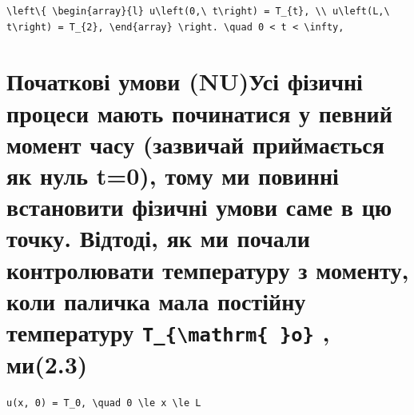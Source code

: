 \documentclass[
  ukrainian,
]{article}
\begin{document}
\begin{verbatim}
\left\{ \begin{array}{l} u\left(0,\ t\right) = T_{t}, \\ u\left(L,\ t\right) = T_{2}, \end{array} \right. \quad 0 < t < \infty,
\end{verbatim}

\section{\texorpdfstring{Початкові умови (NU)Усі фізичні процеси мають
починатися у певний момент часу (зазвичай приймається як нуль t=0), тому
ми повинні встановити фізичні умови саме в цю точку. Відтоді, як ми
почали контролювати температуру з моменту, коли паличка мала постійну
температуру \texttt{T\_\{\textbackslash{}mathrm\{\ \}o\}} ,
ми(2.3)}{Початкові умови (NU)Усі фізичні процеси мають починатися у певний момент часу (зазвичай приймається як нуль t=0), тому ми повинні встановити фізичні умови саме в цю точку. Відтоді, як ми почали контролювати температуру з моменту, коли паличка мала постійну температуру T\_\{\textbackslash mathrm\{ \}o\} , ми(2.3)}}\label{ux43fux43eux447ux430ux442ux43aux43eux432ux456-ux443ux43cux43eux432ux438-nuux443ux441ux456-ux444ux456ux437ux438ux447ux43dux456-ux43fux440ux43eux446ux435ux441ux438-ux43cux430ux44eux442ux44c-ux43fux43eux447ux438ux43dux430ux442ux438ux441ux44f-ux443-ux43fux435ux432ux43dux438ux439-ux43cux43eux43cux435ux43dux442-ux447ux430ux441ux443-ux437ux430ux437ux432ux438ux447ux430ux439-ux43fux440ux438ux439ux43cux430ux454ux442ux44cux441ux44f-ux44fux43a-ux43dux443ux43bux44c-t0-ux442ux43eux43cux443-ux43cux438-ux43fux43eux432ux438ux43dux43dux456-ux432ux441ux442ux430ux43dux43eux432ux438ux442ux438-ux444ux456ux437ux438ux447ux43dux456-ux443ux43cux43eux432ux438-ux441ux430ux43cux435-ux432-ux446ux44e-ux442ux43eux447ux43aux443.-ux432ux456ux434ux442ux43eux434ux456-ux44fux43a-ux43cux438-ux43fux43eux447ux430ux43bux438-ux43aux43eux43dux442ux440ux43eux43bux44eux432ux430ux442ux438-ux442ux435ux43cux43fux435ux440ux430ux442ux443ux440ux443-ux437-ux43cux43eux43cux435ux43dux442ux443-ux43aux43eux43bux438-ux43fux430ux43bux438ux447ux43aux430-ux43cux430ux43bux430-ux43fux43eux441ux442ux456ux439ux43dux443-ux442ux435ux43cux43fux435ux440ux430ux442ux443ux440ux443-t_mathrm-o-ux43cux4382.3}

\begin{verbatim}
u(x, 0) = T_0, \quad 0 \le x \le L
\end{verbatim}
\end{document}

